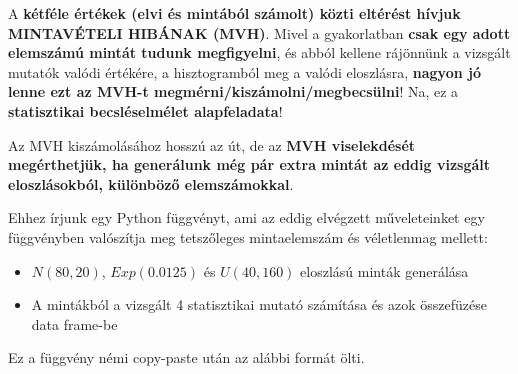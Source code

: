 \documentclass[
]{book}
\providecommand{\tightlist}{%
  \setlength{\itemsep}{0pt}\setlength{\parskip}{0pt}}
\begin{document}
A \textbf{kétféle értékek (elvi és mintából számolt) közti eltérést hívjuk MINTAVÉTELI HIBÁNAK (MVH)}. Mivel a gyakorlatban \textbf{csak egy adott elemszámú mintát tudunk megfigyelni}, és abból kellene rájönnünk a vizsgált mutatók valódi értékére, a hisztogramból meg a valódi eloszlásra, \textbf{nagyon jó lenne ezt az MVH-t megmérni/kiszámolni/megbecsülni}! Na, ez a \textbf{statisztikai becsléselmélet alapfeladata}!

Az MVH kiszámolásához hosszú az út, de az \textbf{MVH viselekdését megérthetjük, ha generálunk még pár extra mintát az eddig vizsgált eloszlásokból, különböző elemszámokkal}.

Ehhez írjunk egy Python függvényt, ami az eddig elvégzett műveleteinket egy függvényben valószítja meg tetszőleges mintaelemszám és véletlenmag mellett:

\begin{itemize}
\tightlist
\item
  \(N(80,20)\), \(Exp(0.0125)\) és \(U(40,160)\) eloszlású minták generálása
\item
  A mintákból a vizsgált 4 statisztikai mutató számítása és azok összefüzése data frame-be
\end{itemize}

Ez a függvény némi copy-paste után az alábbi formát ölti.
\end{document}
